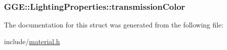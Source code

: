 \hypertarget{struct_g_g_e_1_1_lighting_properties_ab454f09312d4c7e3a094ba7c1aa0bfe2}{
\subsubsection[{transmission\+Color}]{ G\+G\+E\+::\+Lighting\+Properties\+::transmission\+Color}}\label{struct_g_g_e_1_1_lighting_properties_ab454f09312d4c7e3a094ba7c1aa0bfe2}


The documentation for this struct was generated from the following file\+:\begin{DoxyCompactItemize}
\item 
include/\hyperlink{material_8h}{material.\+h}\end{DoxyCompactItemize}
